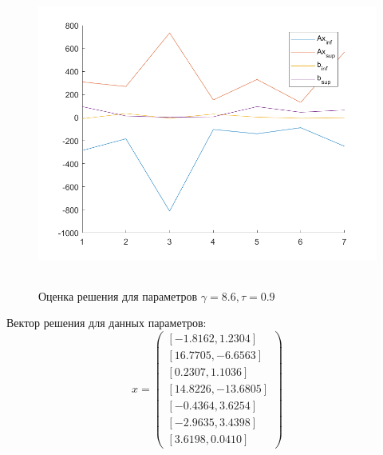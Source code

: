 \documentclass[12pt,a4paper]{scrartcl}
\begin{document}
%
%

\begin{figure}[H]
    \centering
    \includegraphics[width=14cm, height=10cm]{fig/g8_6.png}
	\caption{Оценка решения для параметров $\gamma = 8.6, \tau=0.9$}
\end{figure}

Вектор решения для данных параметров: \begin{equation}
x = \begin{pmatrix}
[-1.8162, 1.2304] \\
[16.7705, -6.6563] \\
[0.2307, 1.1036] \\
[14.8226, -13.6805] \\
[-0.4364, 3.6254] \\
[-2.9635, 3.4398] \\
[3.6198, 0.0410]
\end{pmatrix}
\end{equation}
\end{document}
